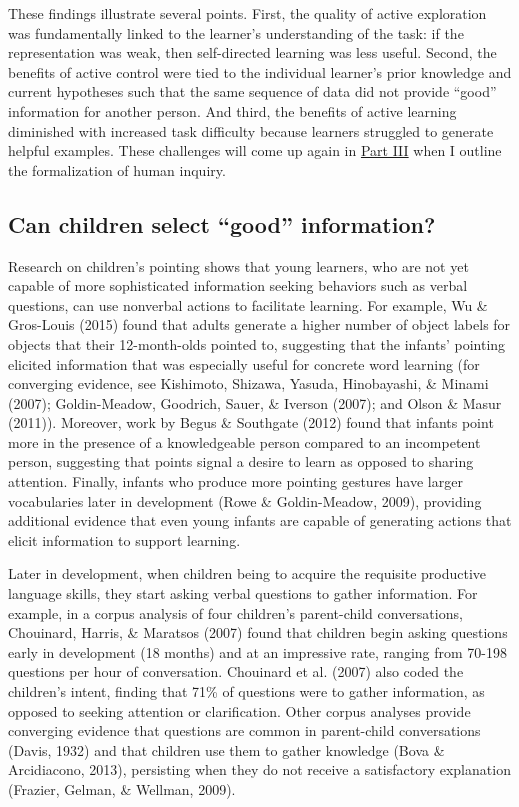 \documentclass[oneside]{report}
\begin{document}
These findings illustrate several points. First, the quality of active
exploration was fundamentally linked to the learner's understanding of
the task: if the representation was weak, then self-directed learning
was less useful. Second, the benefits of active control were tied to the
individual learner's prior knowledge and current hypotheses such that
the same sequence of data did not provide ``good'' information for
another person. And third, the benefits of active learning diminished
with increased task difficulty because learners struggled to generate
helpful examples. These challenges will come up again in
\protect\hyperlink{p3}{Part III} when I outline the formalization of
human inquiry.

\hypertarget{can-children-select-good-information}{%
\subsection{Can children select ``good''
information?}\label{can-children-select-good-information}}

Research on children's pointing shows that young learners, who are not
yet capable of more sophisticated information seeking behaviors such as
verbal questions, can use nonverbal actions to facilitate learning. For
example, Wu \& Gros-Louis (2015) found that adults generate a higher
number of object labels for objects that their 12-month-olds pointed to,
suggesting that the infants' pointing elicited information that was
especially useful for concrete word learning (for converging evidence,
see Kishimoto, Shizawa, Yasuda, Hinobayashi, \& Minami (2007);
Goldin-Meadow, Goodrich, Sauer, \& Iverson (2007); and Olson \& Masur
(2011)). Moreover, work by Begus \& Southgate (2012) found that infants
point more in the presence of a knowledgeable person compared to an
incompetent person, suggesting that points signal a desire to learn as
opposed to sharing attention. Finally, infants who produce more pointing
gestures have larger vocabularies later in development (Rowe \&
Goldin-Meadow, 2009), providing additional evidence that even young
infants are capable of generating actions that elicit information to
support learning.

Later in development, when children being to acquire the requisite
productive language skills, they start asking verbal questions to gather
information. For example, in a corpus analysis of four children's
parent-child conversations, Chouinard, Harris, \& Maratsos (2007) found
that children begin asking questions early in development (18 months)
and at an impressive rate, ranging from 70-198 questions per hour of
conversation. Chouinard et al. (2007) also coded the children's intent,
finding that 71\% of questions were to gather information, as opposed to
seeking attention or clarification. Other corpus analyses provide
converging evidence that questions are common in parent-child
conversations (Davis, 1932) and that children use them to gather
knowledge (Bova \& Arcidiacono, 2013), persisting when they do not
receive a satisfactory explanation (Frazier, Gelman, \& Wellman, 2009).
\end{document}
